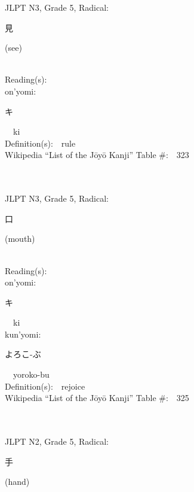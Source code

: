 \begin{multicols}{2}
{JLPT N3, Grade 5, Radical:\ \ {\begin{CJK}{UTF8}{min} 見 \end{CJK}} (see) } \\
Reading(s):\ \ \\
{\hspace*{1em}}on'yomi:\ \ \\
{\hspace*{2em}}{\begin{CJK}{UTF8}{min} キ \end{CJK}}\ \ ki\ \ \\
Definition(s):\ \ rule \\
Wikipedia ``List of the J\=oy\=o Kanji'' Table \#:\ \ 323 \\
\ \ \\
{\fontsize{34pt}{40pt}  }\ \ \\  %
{JLPT N3, Grade 5, Radical:\ \ {\begin{CJK}{UTF8}{min} 口 \end{CJK}} (mouth) } \\
Reading(s):\ \ \\
{\hspace*{1em}}on'yomi:\ \ \\
{\hspace*{2em}}{\begin{CJK}{UTF8}{min} キ \end{CJK}}\ \ ki\ \ \\
{\hspace*{1em}}kun'yomi:\ \ \\
{\hspace*{2em}}{\begin{CJK}{UTF8}{min} よろこ-ぶ \end{CJK}}\ \ yoroko-bu\ \ \\
Definition(s):\ \ rejoice \\
Wikipedia ``List of the J\=oy\=o Kanji'' Table \#:\ \ 325 \\
\ \ \\
{\fontsize{34pt}{40pt}  }\ \ \\  %
{JLPT N2, Grade 5, Radical:\ \ {\begin{CJK}{UTF8}{min} 手 \end{CJK}} (hand) } \\

\end{multicols}
